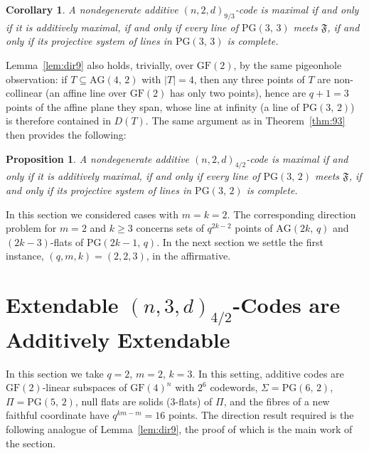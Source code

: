 \documentclass[12pt]{article}
\newtheorem{cor}[thm]{Corollary}
\newtheorem{prop}[thm]{Proposition}
\theoremstyle{definition}
\numberwithin{equation}{section}
\newcommand{\GF}[1]{\mathrm{GF}(#1)}
\newcommand{\PG}[2]{\mathrm{PG}(#1,\,#2)}
\newcommand{\AG}[2]{\mathrm{AG}(#1,\,#2)}
\newcommand{\Afold}{\mathfrak{F}}
\begin{document}
\begin{cor}\label{cor:93max}
A nondegenerate additive $(n,2,d)_{9/3}$-code is maximal if and only if it is additively maximal, if and only if every line of $\PG{3}{3}$ meets $\Afold$, if and only if its projective system of lines in $\PG{3}{3}$ is complete.
\end{cor}

Lemma~\ref{lem:dir9} also holds, trivially, over $\GF{2}$, by the same pigeonhole observation: if $T\subseteq\AG{4}{2}$ with $|T|=4$, then any three points of $T$ are non-collinear (an affine line over $\GF{2}$ has only two points), hence are $q+1=3$ points of the affine plane they span, whose line at infinity (a line of $\PG{3}{2}$) is therefore contained in $D(T)$.  The same argument as in Theorem~\ref{thm:93} then provides the following:

\begin{prop}\label{prop:42max}
	A nondegenerate additive $(n,2,d)_{4/2}$-code is maximal if and only if it is additively maximal, if and only if every line of $\PG{3}{2}$ meets $\Afold$, if and only if its projective system of lines in $\PG{3}{2}$ is complete.
\end{prop}


In this section we considered cases with $m=k=2$.  The corresponding direction problem for $m=2$ and $k\geq3$ concerns sets of $q^{2k-2}$ points of $\AG{2k}{q}$ and $(2k-3)$-flats of $\PG{2k-1}{q}$.  In the next section we settle the first instance, $(q,m,k)=(2,2,3)$, in the affirmative.


\section{Extendable $(n,3,d)_{4/2}$-Codes are Additively Extendable}
\label{sec:43}

In this section we take $q=2$, $m=2$, $k=3$. In this setting, additive codes are $\GF2$-linear subspaces of $\GF4^n$ with $2^6$ codewords, $\Sigma=\PG62$, $\Pi=\PG52$, null flats are solids ($3$-flats) of $\Pi$, and the fibres of a new faithful coordinate have $q^{km-m}=16$ points. The direction result required is the following analogue of Lemma~\ref{lem:dir9}, the proof of which is the main work of the section.
\end{document}
